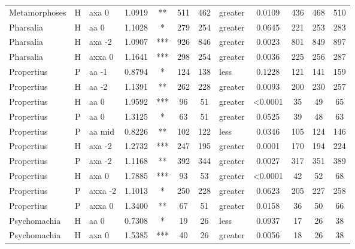 \documentclass[twocolumn, switch]{article} %
\begin{document}
\begin{table}[h!]
\begin{adjustbox}{totalheight=0.9\textheight}
\begin{tabular}{lclcccclcc@{\hspace{1\tabcolsep}}c@{\hspace{1\tabcolsep}}c}
 Metamorphoses &     H &     axa 0 & 1.0919 &      ** &   511 &   462 &  greater &  0.0109 &      436 &      468 &      510 \\
     Pharsalia &     H &      aa 0 & 1.1028 &       * &   279 &   254 &  greater &  0.0645 &      221 &      253 &      283 \\
     Pharsalia &     H &    axa -2 & 1.0907 &     *** &   926 &   846 &  greater &  0.0023 &      801 &      849 &      897 \\
     Pharsalia &     H &    axxa 0 & 1.1641 &     *** &   298 &   254 &  greater &  0.0036 &      225 &      256 &      287 \\
    Propertius &     P &     aa -1 & 0.8794 &       * &   124 &   138 &     less &  0.1228 &      121 &      141 &      159 \\
    Propertius &     H &     aa -2 & 1.1391 &      ** &   262 &   228 &  greater &  0.0093 &      200 &      230 &      257 \\
    Propertius &     H &      aa 0 & 1.9592 &     *** &    96 &    51 &  greater &  <0.0001 &       35 &       49 &       65 \\
    Propertius &     P &      aa 0 & 1.3125 &       * &    63 &    51 &  greater &  0.0525 &       39 &       48 &       63 \\
    Propertius &     P &    aa mid & 0.8226 &      ** &   102 &   122 &     less &  0.0346 &      105 &      124 &      146 \\
    Propertius &     H &    axa -2 & 1.2732 &     *** &   247 &   195 &  greater &  0.0001 &      170 &      194 &      224 \\
    Propertius &     P &    axa -2 & 1.1168 &      ** &   392 &   344 &  greater &  0.0027 &      317 &      351 &      389 \\
    Propertius &     H &     axa 0 & 1.7885 &     *** &    93 &    53 &  greater &  <0.0001 &       42 &       52 &       68 \\
    Propertius &     P &   axxa -2 & 1.1013 &       * &   250 &   228 &  greater &  0.0623 &      205 &      227 &      258 \\
    Propertius &     P &    axxa 0 & 1.3400 &      ** &    67 &    51 &  greater &  0.0158 &       36 &       50 &       66 \\
  Psychomachia &     H &      aa 0 & 0.7308 &       * &    19 &    26 &     less &  0.0937 &       17 &       26 &       38 \\
  Psychomachia &     H &     axa 0 & 1.5385 &     *** &    40 &    26 &  greater &  0.0056 &       18 &       26 &       38 \\

\end{tabular}
\end{adjustbox}
\end{table}
\end{document}
